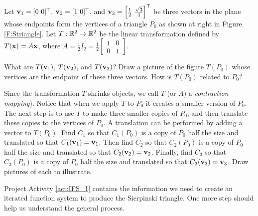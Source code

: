 \begin{pactivity} \label{act:IFS_1} Let $\mathbf{v}_1 = [0 \ 0]^{\mathsf{T}}$, $\mathbf{v}_2 = [1 \ 0]^{\mathsf{T}}$, and $\vv_3 =  \left[ \frac{1}{2} \ \frac{\sqrt{3}}{4}\right]^{\tr}$ be three vectors in the plane whose endpoints form the vertices of a triangle $P_0$ as shown at right in Figure \ref{F:Striangle}. Let $T : \mathbb{R}^2 \to \mathbb{R}^2$ be the linear transformation defined by $T(\mathbf{x}) = A \mathbf{x}$, where $A =  \frac{1}{2} I_2 = \frac{1}{2} \left[ \begin{array}{cc} 1&0 \\ 0&1 \end{array} \right]$. 

\ba
\item What are $T(\mathbf{v}_1)$, $T(\mathbf{v}_2)$, and $T(\mathbf{v}_3)$? Draw a picture of the figure $T(P_0)$ whose vertices are the endpoint of these three vectors. How is $T(P_0)$ related to $P_0$? 
 
\item Since the transformation $T$ shrinks objects, we call $T$ (or $A$) a \emph{contraction mapping}). Notice that when we apply $T$ to $P_0$ it creates a smaller version of $P_0$. The next step is to use $T$ to make three smaller copies of $P_0$, and then translate these copies to the vertices of $P_0$. A translation can be performed by adding a vector to $T(P_0)$. Find $C_1$ so that $C_1(P_0)$ is a copy of $P_0$ half the size and translated so that $C_1(\mathbf{v}_1) = \mathbf{v}_1$. Then find $C_2$ so that $C_2(P_0)$ is a copy of $P_0$ half the size and translated so that $C_2(\mathbf{v}_2) = \mathbf{v}_2$. Finally, find $C_3$ so that $C_3(P_0)$ is a copy of $P_0$ half the size and translated so that $C_3(\mathbf{v}_3) = \mathbf{v}_3$. Draw pictures of each to illustrate. 

\ea

\end{pactivity}

Project Activity \ref{act:IFS_1} contains the information we need to create an iterated function system to produce the Sierpinski triangle. One more step should help us understand the general process.

